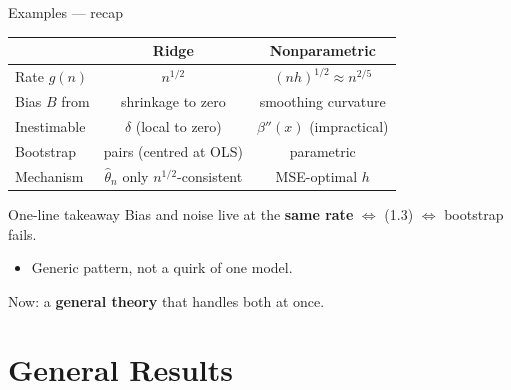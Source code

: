 \documentclass[10pt,aspectratio=169]{beamer}
\theoremstyle{plain}
\begin{document}
\begin{frame}{Examples --- recap}

  \begin{center}
  \footnotesize
  \begin{tabular}{@{}lcc@{}}
    \toprule
    & Ridge & Nonparametric \\
    \midrule
    Rate $g(n)$    & $n^{1/2}$ & $(nh)^{1/2} \approx n^{2/5}$ \\
    Bias $B$ from  & shrinkage to zero & smoothing curvature \\
    Inestimable    & $\delta$ (local to zero) & $\beta''(x)$ (impractical) \\
    Bootstrap      & pairs (centred at OLS) & parametric \\
    Mechanism      & $\hat\theta_n$ only $n^{1/2}$-consistent & MSE-optimal $h$ \\
    \bottomrule
  \end{tabular}
  \end{center}

  \bigskip

  \begin{alertblock}{One-line takeaway}
    \centering
    Bias and noise live at the \textbf{same rate} $\Longleftrightarrow$ (1.3) $\Longleftrightarrow$ bootstrap fails.
  \end{alertblock}

  \begin{itemize}
    \item Generic pattern, not a quirk of one model.
  \end{itemize}

  \medskip

  Now: a \textbf{general theory} that handles both at once.

\end{frame}

\section{General Results}
\end{document}
